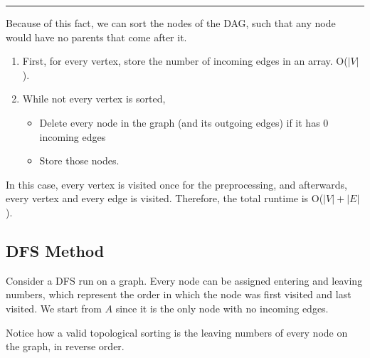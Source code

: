 \documentclass[10pt]{article}
\begin{document}
\noindent\rule{\textwidth}{0.4pt}
Because of this fact, we can sort the nodes of the DAG, such that any node would have no parents that come after it.
\begin{enumerate}
	\item First, for every vertex, store the number of incoming edges in an array.  O($|V|$).
	\item While not every vertex is sorted,
	\begin{itemize}
	    \item Delete every node in the graph (and its outgoing edges) if it has 0 incoming edges
	    \item Store those nodes.
    \end{itemize}
\end{enumerate}
In this case, every vertex is visited once for the preprocessing, and afterwards, every vertex and every edge is visited.  Therefore, the total runtime is O($|V| + |E|$).

\subsection*{DFS Method}
Consider a DFS run on a graph.  Every node can be assigned entering and leaving numbers, which represent the order in which the node was first visited and last visited.  We start from $A$ since it is the only node with no incoming edges.
\begin{center}
\end{center}

Notice how a valid topological sorting is the leaving numbers of every node on the graph, in reverse order.
\end{document}
